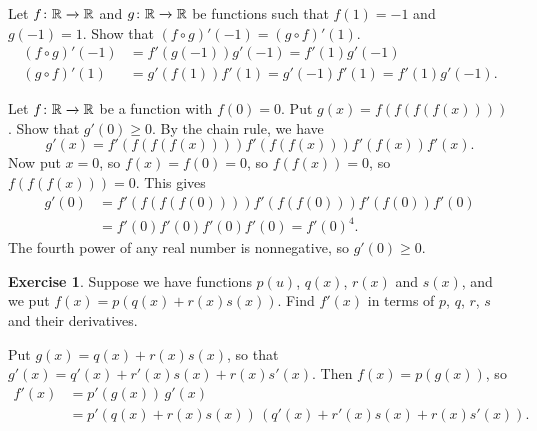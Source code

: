 \documentclass[a4paper]{book}
\theoremstyle{definition}
\newtheorem{exercise}[theorem]{Exercise}
\newenvironment{starex}{
 \renewcommand{\thetheorem}{\arabic{chapter}.\arabic{section}.\arabic{theorem}${}^*$}
 \exercise
}{\endexercise}
\renewenvironment{solution}{\SolutionInline}{\endSolutionInline}
\begin{document}
\begin{starex}
 Let $f\colon{\mathbb{R}}\xrightarrow{}{\mathbb{R}}$ and $g\colon{\mathbb{R}}\xrightarrow{}{\mathbb{R}}$ be functions such that
 $f(1)=-1$ and $g(-1)=1$.  Show that
 $(f\circ g)'(-1)=(g\circ f)'(1)$.
\end{starex}
\begin{solution}
 \begin{align*}
  (f\circ g)'(-1) &= f'(g(-1)) g'(-1) = f'(1) g'(-1) \\
  (g\circ f)'(1)  &= g'(f(1)) f'(1) = g'(-1) f'(1) = f'(1) g'(-1).
 \end{align*}
\end{solution}

\begin{starex}
 Let $f\colon{\mathbb{R}}\xrightarrow{}{\mathbb{R}}$ be a function with $f(0)=0$.  Put
 $g(x)=f(f(f(f(x))))$.  Show that $g'(0)\geq 0$.
\end{starex}
\begin{solution}
 By the chain rule, we have
 \[ g'(x) = f'(f(f(f(x)))) f'(f(f(x))) f'(f(x)) f'(x). \]
 Now put $x=0$, so $f(x)=f(0)=0$, so $f(f(x))=0$, so $f(f(f(x)))=0$.
 This gives
 \begin{align*}
  g'(0) &= f'(f(f(f(0)))) f'(f(f(0))) f'(f(0)) f'(0) \\
        &= f'(0) f'(0) f'(0) f'(0) = f'(0)^4.
 \end{align*}
 The fourth power of any real number is nonnegative, so
 $g'(0)\geq 0$.
\end{solution}

\begin{exercise}
 Suppose we have functions $p(u)$, $q(x)$, $r(x)$ and $s(x)$, and we
 put $f(x)=p(q(x)+r(x)s(x))$.  Find $f'(x)$ in terms of $p$, $q$, $r$,
 $s$ and their derivatives.
\end{exercise}
\begin{solution}
 Put $g(x)=q(x)+r(x)s(x)$, so that $g'(x)=q'(x)+r'(x)s(x)+r(x)s'(x)$.
 Then $f(x)=p(g(x))$, so
 \begin{align*}
  f'(x) &= p'(g(x))\, g'(x) \\
        &= p'(q(x)+r(x)s(x))\, (q'(x) + r'(x)s(x) + r(x)s'(x)).
 \end{align*}
\end{solution}
\end{document}
